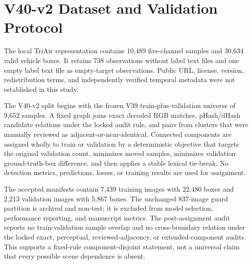 \section{V40-v2 Dataset and Validation Protocol}
The local TriAir representation contains 10,489 five-channel samples and 30,634 valid vehicle boxes. It retains 738 observations without label text files and one empty label text file as empty-target observations. Public URL, license, version, redistribution terms, and independently verified temporal metadata were not established in this study.

The V40-v2 split begins with the frozen V39 train-plus-validation universe of 9,652 samples. A fixed graph joins exact decoded RGB matches, pHash/dHash candidate relations under the locked audit rule, and pairs from clusters that were manually reviewed as adjacent-or-near-identical. Connected components are assigned wholly to train or validation by a deterministic objective that targets the original validation count, minimizes moved samples, minimizes validation ground-truth-box difference, and then applies a stable lexical tie-break. No detection metrics, predictions, losses, or training results are used for assignment.

The accepted manifests contain 7,439 training images with 22,480 boxes and 2,213 validation images with 5,867 boxes. The unchanged 837-image guard partition is archival and non-test; it is excluded from model selection, performance reporting, and manuscript metrics. The post-assignment audit reports no train-validation sample overlap and no cross-boundary relation under the locked exact, perceptual, reviewed-adjacency, or extended-component audits. This supports a fixed-rule component-disjoint statement, not a universal claim that every possible scene dependence is absent.
